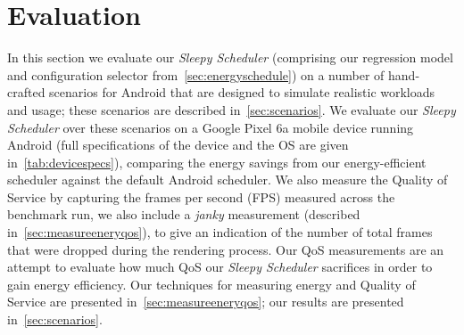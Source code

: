 \documentclass[conference]{IEEEtran}
\begin{document}

\section{Evaluation}


In this section we evaluate our \emph{Sleepy Scheduler} (comprising our regression model and configuration selector from~\cref{sec:energyschedule}) on a number of hand-crafted scenarios for Android that are designed to simulate realistic workloads and usage; these scenarios are described in~\cref{sec:scenarios}. We evaluate our \emph{Sleepy Scheduler} over these scenarios on a Google Pixel 6a mobile device running Android (full specifications of the device and the OS are given in~\cref{tab:devicespecs}), comparing the energy savings from our energy-efficient scheduler against the default Android scheduler. %
We also measure the Quality of Service by capturing the frames per second (FPS) measured across the benchmark run, we also include a \emph{janky} measurement (described in~\cref{sec:measureeneryqos}), to give an indication of the number of total frames that were dropped during the rendering process. Our QoS measurements are an attempt to evaluate how much QoS our \emph{Sleepy Scheduler} sacrifices in order to gain energy efficiency. Our techniques for measuring energy and Quality of Service are presented in~\cref{sec:measureeneryqos}; our results are presented in~\cref{sec:scenarios}.
\end{document}
